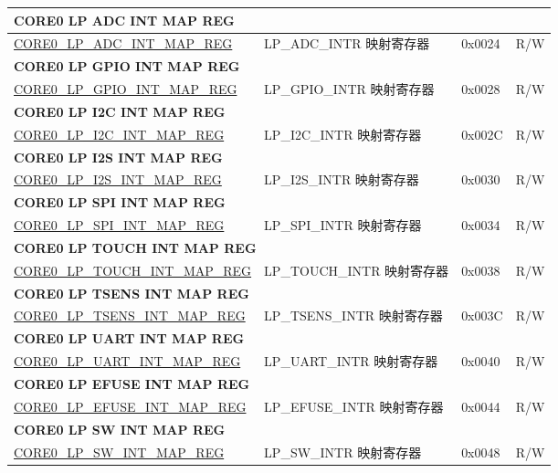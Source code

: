 \begin{longtable}{ | p{8.7cm} | p{6.2cm} | p{1.3cm} | p{1cm} | }
\multicolumn{4}{|l|}{\textbf{CORE0 LP ADC INT MAP REG}} \\ \hline
\hyperref[regdesc:CORE0LPADCINTMAPREG]{CORE0\_LP\_ADC\_INT\_MAP\_REG} & LP\_ADC\_INTR 映射寄存器 & 0x0024 & R/W \\ \hline
\multicolumn{4}{|l|}{\textbf{CORE0 LP GPIO INT MAP REG}} \\ \hline
\hyperref[regdesc:CORE0LPGPIOINTMAPREG]{CORE0\_LP\_GPIO\_INT\_MAP\_REG} & LP\_GPIO\_INTR 映射寄存器 & 0x0028 & R/W \\ \hline
\multicolumn{4}{|l|}{\textbf{CORE0 LP I2C INT MAP REG}} \\ \hline
\hyperref[regdesc:CORE0LPI2CINTMAPREG]{CORE0\_LP\_I2C\_INT\_MAP\_REG} & LP\_I2C\_INTR 映射寄存器 & 0x002C & R/W \\ \hline
\multicolumn{4}{|l|}{\textbf{CORE0 LP I2S INT MAP REG}} \\ \hline
\hyperref[regdesc:CORE0LPI2SINTMAPREG]{CORE0\_LP\_I2S\_INT\_MAP\_REG} & LP\_I2S\_INTR 映射寄存器 & 0x0030 & R/W \\ \hline
\multicolumn{4}{|l|}{\textbf{CORE0 LP SPI INT MAP REG}} \\ \hline
\hyperref[regdesc:CORE0LPSPIINTMAPREG]{CORE0\_LP\_SPI\_INT\_MAP\_REG} & LP\_SPI\_INTR 映射寄存器 & 0x0034 & R/W \\ \hline
\multicolumn{4}{|l|}{\textbf{CORE0 LP TOUCH INT MAP REG}} \\ \hline
\hyperref[regdesc:CORE0LPTOUCHINTMAPREG]{CORE0\_LP\_TOUCH\_INT\_MAP\_REG} & LP\_TOUCH\_INTR 映射寄存器 & 0x0038 & R/W \\ \hline
\multicolumn{4}{|l|}{\textbf{CORE0 LP TSENS INT MAP REG}} \\ \hline
\hyperref[regdesc:CORE0LPTSENSINTMAPREG]{CORE0\_LP\_TSENS\_INT\_MAP\_REG} & LP\_TSENS\_INTR 映射寄存器 & 0x003C & R/W \\ \hline
\multicolumn{4}{|l|}{\textbf{CORE0 LP UART INT MAP REG}} \\ \hline
\hyperref[regdesc:CORE0LPUARTINTMAPREG]{CORE0\_LP\_UART\_INT\_MAP\_REG} & LP\_UART\_INTR 映射寄存器 & 0x0040 & R/W \\ \hline
\multicolumn{4}{|l|}{\textbf{CORE0 LP EFUSE INT MAP REG}} \\ \hline
\hyperref[regdesc:CORE0LPEFUSEINTMAPREG]{CORE0\_LP\_EFUSE\_INT\_MAP\_REG} & LP\_EFUSE\_INTR 映射寄存器 & 0x0044 & R/W \\ \hline
\multicolumn{4}{|l|}{\textbf{CORE0 LP SW INT MAP REG}} \\ \hline
\hyperref[regdesc:CORE0LPSWINTMAPREG]{CORE0\_LP\_SW\_INT\_MAP\_REG} & LP\_SW\_INTR 映射寄存器 & 0x0048 & R/W \\ \hline

\end{longtable}

